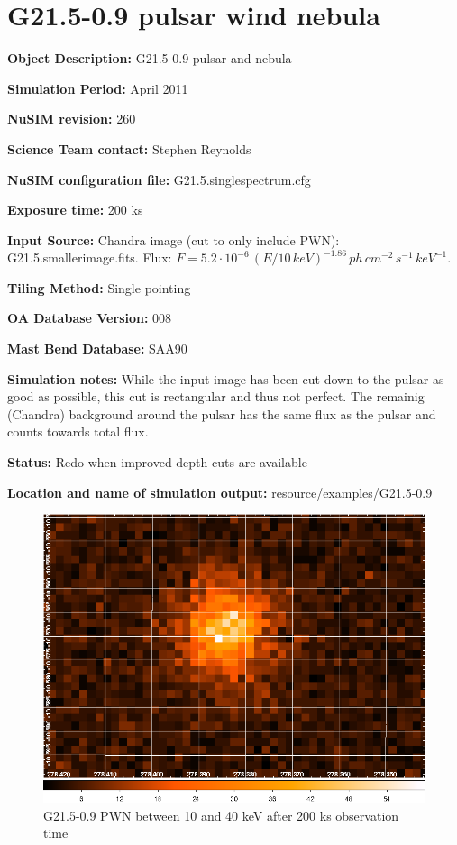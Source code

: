 
\newpage

\section{G21.5-0.9 pulsar wind nebula}

\textbf{Object Description:} G21.5-0.9 pulsar and nebula

\textbf{Simulation Period:} April 2011

\textbf{NuSIM revision:} 260

\textbf{Science Team contact:} Stephen Reynolds

\textbf{NuSIM configuration file:} G21.5.singlespectrum.cfg

\textbf{Exposure time:} 200 ks

\textbf{Input Source:} 
Chandra image (cut to only include PWN): G21.5.smallerimage.fits.
Flux: $F = 5.2\cdot10^{-6}\,(E/10\,keV)^{-1.86}\,ph\,cm^{-2}\,s^{-1}\,keV^{-1}$.

\textbf{Tiling Method:} Single pointing

\textbf{OA Database Version:} 008

\textbf{Mast Bend Database:} SAA90

\textbf{Simulation notes:} While the input image has been cut down to the pulsar as good as possible, this cut is rectangular and thus not perfect. The remainig (Chandra) background around the pulsar has the same flux as the pulsar and counts towards total flux.

\textbf{Status:} 
Redo when improved depth cuts are available

\textbf{Location and name of simulation output:} resource/examples/G21.5-0.9

\begin{figure}[h]
\begin{center}
\includegraphics[width=14cm]{G21.5-0.9/G21.png}
\caption{G21.5-0.9 PWN between 10 and 40 keV after 200 ks observation time}
\label{Vela} 
\end{center}
\end{figure}

